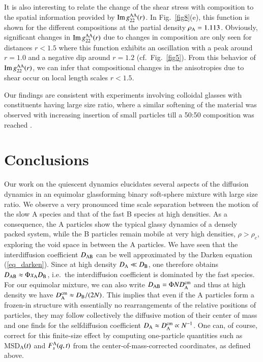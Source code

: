 It is also interesting to relate the change of the shear stress with composition to the spatial information provided by ${\rm Im} \, g_{22}^{\rm AA}(r)$. In Fig.~\ref{fig8}(e), this function is shown for the different compositions at the partial density $\rho_{\rm A}= 1.113$. Obviously, significant  changes in ${\rm Im} \, g_{22}^{\rm AA}(r)$ due to changes in composition are only seen for distances $r<1.5$ where this function exhibits an oscillation with a peak around $r=1.0$ and a negative dip around $r=1.2$ (cf.~Fig.~\ref{fig5}). From this behavior of ${\rm Im} \, g_{22}^{\rm AA}(r)$, we can infer that compositional changes in the anisotropies due to shear occur on local length scales $r<1.5$.

Our findings are consistent with experiments involving colloidal glasses with constituents having large size ratio, where a similar softening of the material was observed with increasing insertion of small particles till a 50:50 composition was reached \cite{sentjabrskaja18, sentjabrskaja19}.

%
\section{Conclusions}
%
Our work on the quiescent dynamics elucidates several aspects of the diffusion dynamics in an equimolar glassforming binary soft-sphere mixture with large size ratio.  We observe a very pronounced time scale separation between the motion of the slow A species and that of the fast B species at high densities. As a consequence, the A particles show the typical glassy dynamics of a densely packed system, while the B particles remain mobile at very high densities, $\rho > \rho_c$, exploring the void space in between the A particles. We have seen that the interdiffusion coefficient $D_{\rm AB}$ can be well approximated by the Darken equation (\ref{eq_darken}).  Since at high density $D_{\rm A} \ll D_{\rm B}$, one therefore obtains $D_{\rm AB} \approx \Phi x_{\rm A} D_{\rm B}$, i.e.~the interdiffusion coefficient is dominated by the fast species.  For our equimolar mixture, we can also write $D_{\rm AB} = \Phi N D_{\rm A}^{\rm cm}$ and thus at high density we have $D_{\rm A}^{\rm cm} \approx D_{\rm B}/(2N)$.  This implies that even if the A particles form a frozen-in structure with essentially no rearrangements of the relative positions of particles, they may follow collectively the diffusive motion of their center of mass and one finds for the selfdiffusion coefficient $D_{\rm A} \approx D_{\rm A}^{\rm cm} \propto N^{-1}$. One can, of course, correct for this finite-size effect by computing one-particle quantities such as MSD$_{\rm A}(t)$ and $F_s^{\rm A}(q,t)$ from the center-of-mass-corrected coordinates, as defined above.

